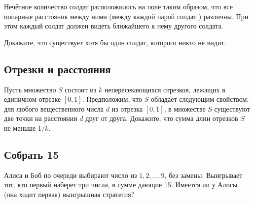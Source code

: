 Нечётное количество солдат расположилось на поле таким образом, что все попарные расстояния между ними (между каждой парой солдат ) различны. 
При этом каждый солдат должен видеть  ближайшего к нему другого солдата.

Докажите, что существует хотя бы один солдат, которого никто не видит.




\subsection*{Отрезки и расстояния}    %


Пусть множество $S$ состоит из $k$ непересекающихся отрезков, лежащих в единичном отрезке $[0,1]$. 
Предположим, что $S$ обладает следующим свойством: для любого вещественного числа $d$ из отрезка $[0,1]$,  в множестве $S$ существуют две точки на расстоянии $d$ друг от друга. 
Докажите, что сумма длин отрезков $S$ не меньше $1/k$.

   
\subsection*{Собрать 15} %

Алиса и Боб по очереди выбирают число из $1, 2,\dots,9$, без замены. 
Выигрывает тот, кто первый наберет три числа, в сумме дающие 15. 
Имеется ли у Алисы (она ходит первая)
выигрышная стратегия?